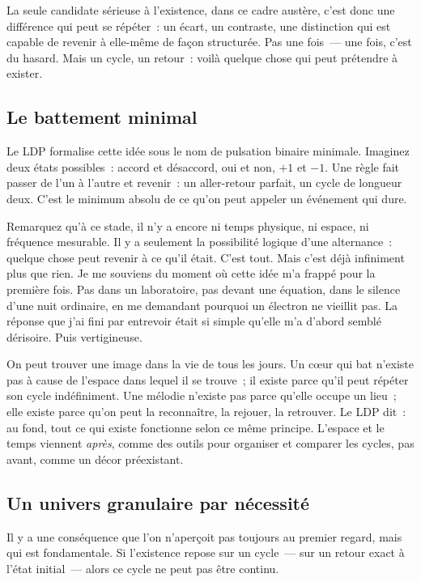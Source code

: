 \documentclass[12pt, a4paper, openright]{book}
\begin{document}
\medskip

La seule candidate sérieuse à l'existence, dans ce cadre austère, c'est donc une différence qui peut se répéter~: un écart, un contraste, une distinction qui est capable de revenir à elle-même de façon structurée. Pas une fois~--- une fois, c'est du hasard. Mais un cycle, un retour~: voilà quelque chose qui peut prétendre à exister.

\subsection*{Le battement minimal}

Le LDP formalise cette idée sous le nom de pulsation binaire minimale. Imaginez deux états possibles~: accord et désaccord, oui et non, $+1$ et $-1$. Une règle fait passer de l'un à l'autre et revenir~: un aller-retour parfait, un cycle de longueur deux. C'est le minimum absolu de ce qu'on peut appeler un événement qui dure.

\medskip

Remarquez qu'à ce stade, il n'y a encore ni temps physique, ni espace, ni fréquence mesurable. Il y a seulement la possibilité logique d'une alternance~: quelque chose peut revenir à ce qu'il était. C'est tout. Mais c'est déjà infiniment plus que rien. Je me souviens du moment où cette idée m'a frappé pour la première fois. Pas dans un laboratoire, pas devant une équation, dans le silence d'une nuit ordinaire, en me demandant pourquoi un électron ne vieillit pas. La réponse que j'ai fini par entrevoir était si simple qu'elle m'a d'abord semblé dérisoire. Puis vertigineuse.

\medskip

On peut trouver une image dans la vie de tous les jours. Un c\oe{}ur qui bat n'existe pas à cause de l'espace dans lequel il se trouve~; il existe parce qu'il peut répéter son cycle indéfiniment. Une mélodie n'existe pas parce qu'elle occupe un lieu~; elle existe parce qu'on peut la reconnaître, la rejouer, la retrouver. Le LDP dit~: au fond, tout ce qui existe fonctionne selon ce même principe. L'espace et le temps viennent \emph{après}, comme des outils pour organiser et comparer les cycles, pas avant, comme un décor préexistant.

\subsection*{Un univers granulaire par nécessité}

Il y a une conséquence que l'on n'aperçoit pas toujours au premier regard, mais qui est fondamentale. Si l'existence repose sur un cycle~--- sur un retour exact à l'état initial~--- alors ce cycle ne peut pas être continu.
\end{document}
